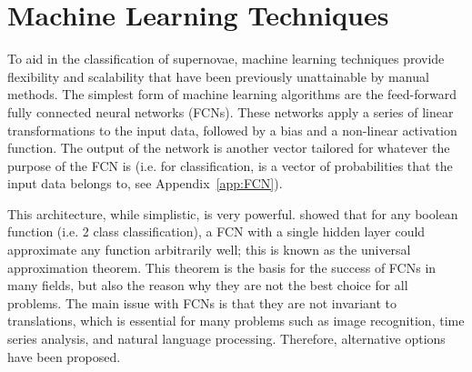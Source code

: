 \chapter{Machine Learning Techniques}
\label{chap:MLTechniques}

To aid in the classification of supernovae, machine learning techniques provide 
flexibility and scalability that have been previously unattainable by manual 
methods. The simplest form of machine learning algorithms are the feed-forward 
fully connected neural networks (FCNs). These networks apply a series of linear 
transformations to the input data, followed by a bias and a non-linear activation 
function. The output of the network is another vector tailored for whatever the 
purpose of the FCN is (i.e. for classification, is a vector of probabilities 
that the input data belongs to, see Appendix~\ref{app:FCN}). 

This architecture, while simplistic, is very powerful. \textcite{cybenko1989} showed that for any boolean 
function (i.e. 2 class classification), a FCN with a single hidden layer could 
approximate any function arbitrarily well; this is known as the universal approximation
theorem. This theorem is the basis for the success of FCNs in
many fields, but also the reason why they are not the best choice for all problems.
The main issue with FCNs is that they are not invariant to translations, which is 
essential for many problems such as image recognition, time series analysis, and 
natural language processing. Therefore, alternative options have been proposed. 
